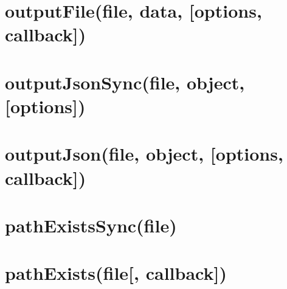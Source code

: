 \documentclass[twoside]{book}
\newcommand{\+}{\discretionary{\mbox{\scriptsize$\hookleftarrow$}}{}{}}
\begin{document}
\chapter{output\+File(file, data, \mbox{[}options, callback\mbox{]})}
\label{md_dsmacc_examples_DRmerge_node_modules_electron-packager_node_modules_fs-extra_docs_outputFile}

\chapter{output\+Json\+Sync(file, object, \mbox{[}options\mbox{]})}
\label{md_dsmacc_examples_DRmerge_node_modules_electron-packager_node_modules_fs-extra_docs_outputJson-sync}

\chapter{output\+Json(file, object, \mbox{[}options, callback\mbox{]})}
\label{md_dsmacc_examples_DRmerge_node_modules_electron-packager_node_modules_fs-extra_docs_outputJson}

\chapter{path\+Exists\+Sync(file)}
\label{md_dsmacc_examples_DRmerge_node_modules_electron-packager_node_modules_fs-extra_docs_pathExists-sync}

\chapter{path\+Exists(file\mbox{[}, callback\mbox{]})}
\label{md_dsmacc_examples_DRmerge_node_modules_electron-packager_node_modules_fs-extra_docs_pathExists}

\end{document}
